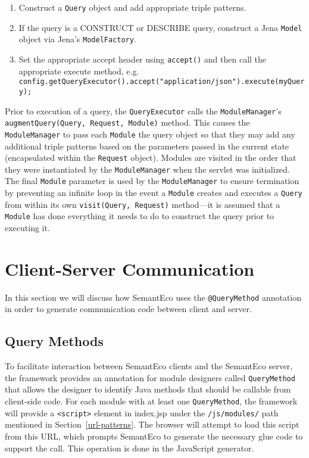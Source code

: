 \documentclass[letterpaper]{report}
\begin{document}
\begin{enumerate}
\item Construct a \texttt{Query} object and add appropriate triple patterns.
\item If the query is a CONSTRUCT or DESCRIBE query, construct a Jena \texttt{Model} object via Jena's \texttt{ModelFactory}.
\item Set the appropriate accept header using \texttt{accept()} and then call the appropriate execute method, e.g. \texttt{config.getQueryExecutor().accept("application/json").execute(myQuery);}
\end{enumerate}

Prior to execution of a query, the \texttt{QueryExecutor} calls the \texttt{ModuleManager}'s \texttt{augmentQuery(Query, Request, Module)} method. This causes the \texttt{ModuleManager} to pass each \texttt{Module} the query object so that they may add any additional triple patterns based on the parameters passed in the current state (encapsulated within the \texttt{Request} object). Modules are visited in the order that they were instantiated by the \texttt{ModuleManager} when the servlet was initialized. The final \texttt{Module} parameter is used by the \texttt{ModuleManager} to ensure termination by preventing an infinite loop in the event a \texttt{Module} creates and executes a \texttt{Query} from within its own \texttt{visit(Query, Request)} method---it is assumed that a \texttt{Module} has done everything it needs to do to construct the query prior to executing it.

\section{Client-Server Communication}
\label{client-server-comm}
In this section we will discuss how SemantEco uses the \texttt{@QueryMethod} annotation in order to generate communication code between client and server. 

\subsection{Query Methods}
To facilitate interaction between SemantEco clients and the SemantEco server, the framework provides an annotation for module designers called \texttt{QueryMethod} that allows the designer to identify Java methods that should be callable from client-side code. For each module with at least one \texttt{QueryMethod}, the framework will provide a \texttt{<script>} element in index.jsp under the \texttt{/js/modules/} path mentioned in Section~\ref{url-patterns}. The browser will attempt to load this script from this URL, which prompts SemantEco to generate the necessary glue code to support the call. This operation is done in the JavaScript generator.
\end{document}
